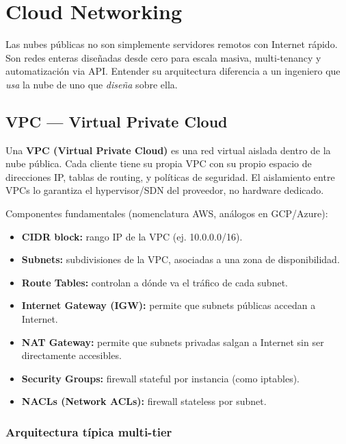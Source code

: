 
\chapter{ Cloud Networking}

Las nubes públicas no son simplemente servidores remotos con Internet rápido. Son
redes enteras diseñadas desde cero para escala masiva, multi-tenancy y automatización
via API. Entender su arquitectura diferencia a un ingeniero que \emph{usa} la nube
de uno que \emph{diseña} sobre ella.

\section{ VPC --- Virtual Private Cloud}

\begin{concepto}
Una \textbf{VPC (Virtual Private Cloud)} es una red virtual aislada dentro de la
nube pública. Cada cliente tiene su propia VPC con su propio espacio de direcciones IP,
tablas de routing, y políticas de seguridad. El aislamiento entre VPCs lo garantiza
el hypervisor/SDN del proveedor, no hardware dedicado.

Componentes fundamentales (nomenclatura AWS, análogos en GCP/Azure):
\begin{itemize}
    \item \textbf{CIDR block:} rango IP de la VPC (ej. 10.0.0.0/16).
    \item \textbf{Subnets:} subdivisiones de la VPC, asociadas a una zona de disponibilidad.
    \item \textbf{Route Tables:} controlan a dónde va el tráfico de cada subnet.
    \item \textbf{Internet Gateway (IGW):} permite que subnets públicas accedan a Internet.
    \item \textbf{NAT Gateway:} permite que subnets privadas salgan a Internet sin
          ser directamente accesibles.
    \item \textbf{Security Groups:} firewall stateful por instancia (como iptables).
    \item \textbf{NACLs (Network ACLs):} firewall stateless por subnet.
\end{itemize}
\end{concepto}

\subsection{Arquitectura típica multi-tier}

